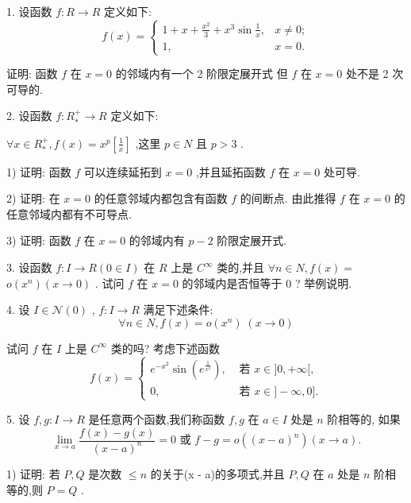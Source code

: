 1. 设函数 $f : R \rightarrow  R$ 定义如下:
$$f\left( x\right)  = \left\{  \begin{array}{ll} 1 + x + \frac{{x}^{2}}{3} + {x}^{3}\sin \frac{1}{x}, & x \neq  0; \\  1, & x = 0. \end{array}\right.$$

证明: 函数 $f$ 在 $x = 0$ 的邻域内有一个 2 阶限定展开式 但 $f$ 在 $x = 0$ 处不是 2 次可导的.

2. 设函数 $f : {R}_{ * }^{ + } \rightarrow  R$ 定义如下:

$\forall x \in  {R}_{ * }^{ + },f\left( x\right)  = {x}^{p}\left\lbrack  \frac{1}{x}\right\rbrack$ ,这里 $p \in  N$ 且 $p > 3$ .

1) 证明: 函数 $f$ 可以连续延拓到 $x = 0$ ,并且延拓函数 $f$ 在 $x = 0$ 处可导.

2) 证明: 在 $x = 0$ 的任意邻域内都包含有函数 $f$ 的间断点. 由此推得 $f$ 在 $x = 0$ 的任意邻域内都有不可导点.

3) 证明: 函数 $f$ 在 $x = 0$ 的邻域内有 $p - 2$ 阶限定展开式.

3. 设函数 $f : I \rightarrow  R\left( {0 \in  I}\right)$ 在 $R$ 上是 ${C}^{\infty }$ 类的,并且 $\forall n \in  N,f\left( x\right)  =$  $o\left( {x}^{n}\right) \left( {x \rightarrow  0}\right)$ . 试问 $f$ 在 $x = 0$ 的邻域内是否恒等于 0 ? 举例说明.

4. 设 $I \in  \mathcal{N}\left( 0\right)$ , $f : I \rightarrow  R$ 满足下述条件:
$$\forall n \in  N,f\left( x\right)  = o\left( {x}^{n}\right) \;\left( {x \rightarrow  0}\right)$$

试问 $f$ 在 $I$ 上是 ${C}^{\infty }$ 类的吗? 考虑下述函数
$$f\left( x\right)  = \left\{  \begin{array}{ll} {e}^{-{x}^{2}}\sin \left( {e}^{\frac{1}{{x}^{2}}}\right) , & \text{ 若 }x \in  \rbrack 0, + \infty \lbrack , \\  0, & \text{ 若 }x \in  \rbrack  - \infty ,0\rbrack . \end{array}\right.$$

5. 设 $f,g : I \rightarrow  R$ 是任意两个函数,我们称函数 $f,g$ 在 $a \in  I$ 处是 $n$ 阶相等的, 如果
$$\mathop{\lim }\limits_{{x \rightarrow  a}}\frac{f\left( x\right)  - g\left( x\right) }{{\left( x - a\right) }^{n}} = 0\text{ 或 }f - g = o\left( {\left( x - a\right) }^{n}\right) \left( {x \rightarrow  a}\right) .$$

1) 证明: 若 $P,Q$ 是次数 $\leq  n$ 的关于(x - a)的多项式,并且 $P,Q$ 在 $a$ 处是 $n$ 阶相等的,则 $P = Q$ .

